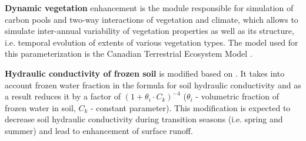 \documentclass[a0b,landscape]{a0poster}
\begin{document}
\begin{multicols*}{4}
\noindent
\textbf{Dynamic vegetation} enhancement is the module responsible for simulation
of carbon pools and two-way interactions of vegetation and climate, which allows
to simulate inter-annual variability of vegetation properties as well as its
structure, i.e. temporal evolution of extents of various vegetation types.
The model used for this parameterization is the Canadian Terrestrial Ecosystem
Model \citep[CTEM, ][]{melton2016}.

\vspace{0.25cm}
\noindent
\textbf{Hydraulic conductivity of frozen soil} is modified based on \citet{ganji2017}. It takes into account frozen water fraction in the
formula for soil hydraulic conductivity and as a result reduces it by a factor of $(1 + \theta_i \cdot C_k)^{-4}$ ($\theta_i$ - volumetric
fraction of frozen water in soil, $C_k$ - constant parameter). This modification is expected to decrease soil hydraulic conductivity during transition seasons (i.e. spring and summer) and
lead to enhancement of surface runoff.

\vspace{0.25cm}
\noindent
{}
%
\hfill
%







\end{multicols*}
\end{document}
